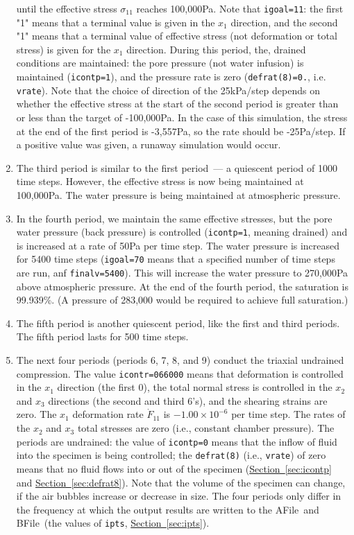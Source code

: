 \documentclass[letterpaper,11pt]{article}
\newcommand{\AFile}{\textsf{AFile}}
\newcommand{\BFile}{\textsf{BFile}}
\begin{document}
\begin{enumerate}
until the effective stress $\sigma_{11}$
reaches 100,000Pa.
Note that \texttt{igoal=11}: the first "1"
means that a terminal value is given in the $x_{1}$
direction, and the second "1" means that a terminal
value of effective stress
(not deformation or total stress)
is given for the $x_{1}$ direction.
During this period, the, drained conditions are
maintained:
the pore pressure (not water infusion) is maintained
(\texttt{icontp=1}), and the pressure rate
is zero (\texttt{defrat(8)=0.}, i.e. \texttt{vrate}).
Note that the choice of direction of the 25kPa/step depends
on whether the effective stress at the start of the second
period is greater than or less than the target
of -100,000Pa.
In the case of this simulation,
the stress at the end of the first period is
-3,557Pa, so the rate should be -25Pa/step.
If a positive value was given, a runaway simulation
would occur.
%
\item
The third period is similar to the first
period~--- a quiescent period of 1000 time steps.
However, the effective stress is now being maintained
at 100,000Pa.
The water pressure is being maintained at atmospheric pressure.
%
\item
In the fourth period,
we maintain the same effective stresses,
but the pore water pressure (back pressure)
is controlled (\texttt{icontp=1}, meaning drained)
and is increased
at a rate of 50Pa per time step.
The water pressure is increased
for 5400 time steps (\texttt{igoal=70} means that
a specified number of time steps are run,
anf \texttt{finalv=5400}).
This will increase the water pressure to 270,000Pa
above atmospheric pressure.
At the end of the fourth period,
the saturation is 99.939\%.
(A pressure of 283,000 would be required
to achieve full saturation.)
%
\item
The fifth period is another quiescent period,
like the first and third periods.
The fifth period lasts for 500 time steps.
%
\item
The next four periods (periods 6, 7, 8, and 9)
conduct the triaxial undrained compression.
The value \texttt{icontr=066000} means that deformation
is controlled in the $x_{1}$ direction (the first 0),
the total normal stress is controlled
in the $x_{2}$ and $x_{3}$ directions (the second
and third 6's),
and the shearing strains are zero.
The $x_{1}$ deformation rate $\dot{F}_{11}$
is $-1.00\times 10^{-6}$ per time step.
The rates of the $x_{2}$ and $x_{3}$ total stresses
are zero (i.e., constant chamber pressure).
The periods are undrained:
the value of \texttt{icontp=0} means that the inflow
of fluid into the specimen is being controlled;
the \texttt{defrat(8)} (i.e., \texttt{vrate})
of zero means that no fluid
flows into or out of the specimen
(\hyperref[sec:icontp]{Section~\ref*{sec:icontp}}
and \hyperref[sec:defrat8]{Section~\ref*{sec:defrat8}}).
Note that the volume of the specimen can change,
if the air bubbles increase or decrease in size.
The four periods only differ in the frequency
at which the output results are written to
the \AFile\ and \BFile\ (the values of \texttt{ipts},
\hyperref[sec:ipts]{Section~\ref*{sec:ipts}}).
\end{enumerate}
%
%
%
%
\end{document}
